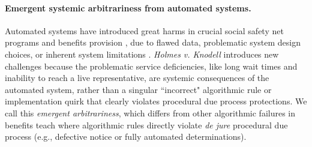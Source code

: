\documentclass[manuscript,screen,authorversion]{acmart}
\begin{document}

\paragraph{Emergent systemic arbitrariness from automated systems.}
Automated systems have introduced great harms in crucial social safety net programs and benefits provision \citep{eubanks2018automating,btah,richardson2019litigating}, due to flawed data, problematic system design choices, or inherent system limitations \citep{gules2025algorithmic}. %
\textit{Holmes v. Knodell} introduces new challenges because the problematic service deficiencies, like long wait times and inability to reach a live representative, are systemic consequences of the automated system, rather than a singular ``incorrect" algorithmic rule or implementation quirk that clearly violates procedural due process protections. %
We call this \textit{emergent arbitrariness}, which differs from other algorithmic failures in benefits teach where algorithmic rules directly violate \textit{de jure} procedural due process (e.g., defective notice or fully automated determinations).
\end{document}
